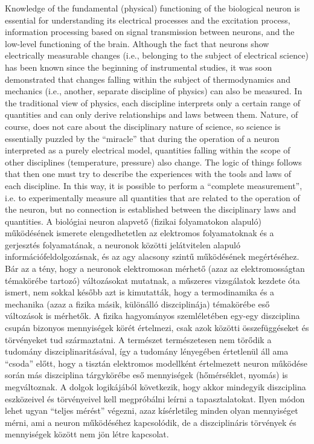 \ifx\magyar\undefined
 Knowledge of the fundamental (physical) functioning of the biological neuron is essential for understanding its electrical processes and the excitation process, information processing based on signal transmission between neurons, and the low-level functioning of the brain. Although the fact that neurons show electrically measurable changes (i.e., belonging to the subject of electrical science) has been known since the beginning of instrumental studies, it was soon demonstrated that changes falling within the subject of thermodynamics and mechanics (i.e., another, separate discipline of physics) can also be measured. In the traditional view of physics, each discipline interprets only a certain range of quantities and can only derive relationships and laws between them. Nature, of course, does not care about the disciplinary nature of science, so science is essentially puzzled by the “miracle” that during the operation of a neuron interpreted as a purely electrical model, quantities falling within the scope of other disciplines (temperature, pressure) also change. The logic of things follows that then one must try to describe the experiences with the tools and laws of each discipline. In this way, it is possible to perform a “complete measurement”,
i.e. to experimentally measure all quantities that are related to the operation of the neuron, but no connection is established between the disciplinary laws and quantities.
\else
A biológiai neuron alapvető (fizikai folyamatokon alapuló) működésének ismerete elengedhetetlen az elektromos folyamatoknak és a gerjesztés folyamatának, a neuronok közötti jelátvitelen alapuló információfeldolgozásnak, és az agy alacsony szintű működésének megértéséhez. Bár az a tény, hogy a neuronok elektromosan mérhető (azaz az elektromosságtan témakörébe tartozó) változásokat mutatnak, a műszeres vizsgálatok kezdete óta ismert, nem sokkal később azt is kimutatták, hogy a termodinamika és a mechanika (azaz a fizika másik, különálló diszciplinája) témakörébe eső változások is mérhetők. A fizika hagyományos szemléletében egy-egy diszciplina csupán bizonyos  mennyiségek körét értelmezi, csak azok közötti összefüggéseket és törvényeket tud származtatni. A természet természetesen nem törődik a tudomány diszciplinaritásával, így a tudomány lényegében értetlenül áll ama “csoda” előtt, hogy a tisztán elektromos modellként értelmezett neuron működése során más diszciplina tárgykörébe eső mennyiségek (hőmérséklet, nyomás) is megváltoznak. A dolgok logikájából következik, hogy akkor mindegyik diszciplina eszközeivel és törvényeivel kell megpróbálni leírni a tapasztalatokat. Ilyen módon lehet ugyan “teljes mérést” végezni, 
azaz kísérletileg minden olyan mennyiséget mérni, ami a neuron működéséhez kapcsolódik, de a diszciplináris törvények és mennyiségek között nem jön létre kapcsolat.
\fi

